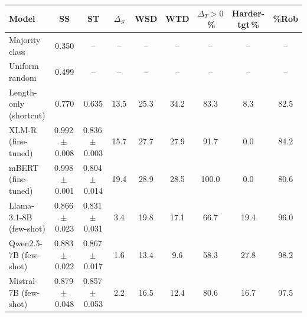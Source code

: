 \begin{tabular}{lcccccccc}
\toprule
Model & SS & ST & $\overline{\Delta_S}$ & WSD & WTD & $\Delta_T{>}0$\,\% & Harder-tgt\,\% & \%Rob \\
\midrule
Majority class & 0.350 & -- & -- & -- & -- & -- & -- & -- \\
Uniform random & 0.499 & -- & -- & -- & -- & -- & -- & -- \\
Length-only (shortcut) & 0.770 & 0.635 & 13.5 & 25.3 & 34.2 & 83.3 & 8.3 & 82.5 \\
\midrule
XLM-R (fine-tuned) & 0.992\,$\pm$\,0.008 & 0.836\,$\pm$\,0.003 & 15.7 & 27.7 & 27.9 & 91.7 & 0.0 & 84.2 \\
mBERT (fine-tuned) & 0.998\,$\pm$\,0.001 & 0.804\,$\pm$\,0.014 & 19.4 & 28.9 & 28.5 & 100.0 & 0.0 & 80.6 \\
\midrule
Llama-3.1-8B (few-shot) & 0.866\,$\pm$\,0.023 & 0.831\,$\pm$\,0.031 & 3.4 & 19.8 & 17.1 & 66.7 & 19.4 & 96.0 \\
Qwen2.5-7B (few-shot) & 0.883\,$\pm$\,0.022 & 0.867\,$\pm$\,0.017 & 1.6 & 13.4 & 9.6 & 58.3 & 27.8 & 98.2 \\
Mistral-7B (few-shot) & 0.879\,$\pm$\,0.048 & 0.857\,$\pm$\,0.053 & 2.2 & 16.5 & 12.4 & 80.6 & 16.7 & 97.5 \\
\bottomrule
\end{tabular}
